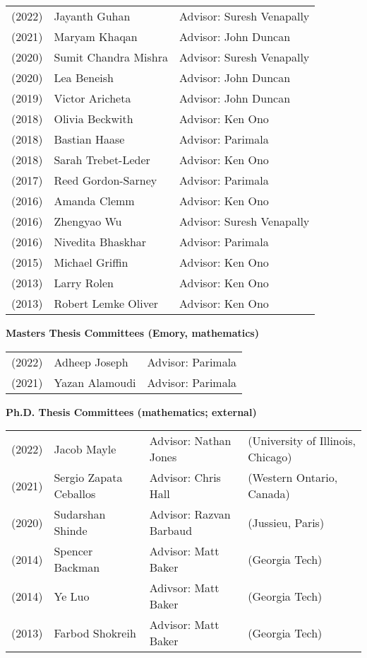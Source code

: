 \documentclass[margin,line]{res}
\begin{document}
\begin{resume}
\begin{tabular}{lll}
(2022) & Jayanth Guhan & Advisor: Suresh Venapally\\    
(2021) & Maryam Khaqan & Advisor: John Duncan\\    
(2020) & Sumit Chandra Mishra & Advisor: Suresh Venapally\\  
(2020) & Lea Beneish & Advisor: John Duncan\\
(2019) & Victor Aricheta & Advisor: John Duncan\\
(2018) & Olivia Beckwith & Advisor: Ken Ono\\
(2018) & Bastian Haase & Advisor: Parimala\\
(2018) & Sarah Trebet-Leder & Advisor: Ken Ono\\
(2017) & Reed Gordon-Sarney & Advisor: Parimala\\
(2016) & Amanda Clemm & Advisor: Ken Ono\\
(2016) & Zhengyao Wu & Advisor: Suresh Venapally\\
(2016) & Nivedita Bhaskhar & Advisor: Parimala\\
(2015) & Michael Griffin & Advisor: Ken Ono\\
(2013) & Larry Rolen & Advisor: Ken Ono\\
(2013) & Robert Lemke Oliver & Advisor: Ken Ono\\
\end{tabular}



{\bf Masters Thesis Committees (Emory, mathematics)}
\vspace*{-.15in}

\begin{tabular}{lll}
  (2022) & Adheep Joseph & Advisor: Parimala\\
  (2021) & Yazan Alamoudi & Advisor: Parimala\\    
\end{tabular}

{\bf Ph.D. Thesis Committees (mathematics; external)}
\vspace*{-.15in}

\begin{tabular}{llll}
(2022) & Jacob Mayle & Advisor:  Nathan Jones & (University of Illinois, Chicago)\\    
(2021) & Sergio Zapata Ceballos & Advisor:  Chris Hall & (Western Ontario, Canada)\\  
(2020) & Sudarshan Shinde & Advisor:  Razvan Barbaud & (Jussieu, Paris)\\
(2014) & Spencer Backman & Advisor: Matt Baker & (Georgia Tech)\\
(2014) & Ye Luo & Adivsor: Matt Baker & (Georgia Tech)\\
(2013) & Farbod Shokreih &  Advisor: Matt Baker & (Georgia Tech)\\
\end{tabular}


\end{resume}
\end{document}
